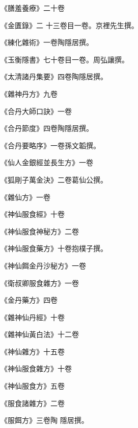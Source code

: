 \begin{pinyinscope}
 《膳羞養療》二十卷



 《金匱錄》二
 十三卷目一卷。京裡先生撰。



 《練化雜術》一卷陶隱居撰。



 《玉衡隱書》七十卷目一卷。周弘讓撰。



 《太清諸丹集要》四卷陶隱居撰。



 《雜神丹方》九卷



 《合丹大師口訣》一卷



 《合丹節度》四卷陶隱居撰。



 《合丹要略序》一卷孫文韜撰。



 《仙人金銀經並長生方》一卷



 《狐剛子萬金決》二卷葛仙公撰。



 《雜仙方》一卷



 《神仙服食經》十卷



 《神仙服食神秘方》二卷



 《神仙服食藥方》十卷抱樸子撰。



 《神仙餌金丹沙秘方》一卷



 《衛叔卿服食雜方》一卷



 《金丹藥方》四卷



 《雜神仙丹經》十卷



 《雜神仙黃白法》十二卷



 《神仙雜方》十五卷



 《神仙服食雜方》十卷



 《神仙服食方》五卷



 《服食諸雜方》二卷



 《服餌方》三卷陶
 隱居撰。




\end{pinyinscope}
